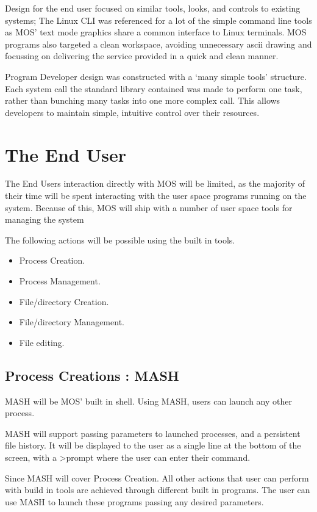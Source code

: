 \documentclass[a4paper]{report}
\begin{document}
Design for the end user focused on similar tools, looks, and controls to existing systems; The Linux CLI was referenced for a lot of the simple command line tools as MOS' text mode graphics share a common interface to Linux terminals. MOS programs also targeted a clean workspace, avoiding unnecessary ascii drawing and focussing on delivering the service provided in a quick and clean manner.

Program Developer design was constructed with a `many simple tools' structure. Each system call the standard library contained was made to perform one task, rather than bunching many tasks into one more complex call. This allows developers to maintain simple, intuitive control over their resources.


\clearpage
\section{The End User}

The End Users interaction directly with MOS will be limited, as the majority of their time will be spent interacting with the user space programs running on the system. Because of this, MOS will ship with a number of user space tools for managing the system

The following actions will be possible using the built in tools.
\begin{itemize}
\item Process Creation.
\item Process Management.
\item File/directory Creation.
\item File/directory Management.
\item File editing.
\end{itemize}

\subsection {Process Creations : MASH}

MASH will be MOS' built in shell. Using MASH, users can launch any other process.

MASH will support passing parameters to launched processes, and a persistent file history. It will be displayed to the user as a single line at the bottom of the screen, with a \textgreater  prompt where the user can enter their command.

Since MASH will cover Process Creation. All other actions that user can perform with build in tools are achieved through different built in programs. The user can use MASH to launch these programs passing any desired parameters.
\end{document}
